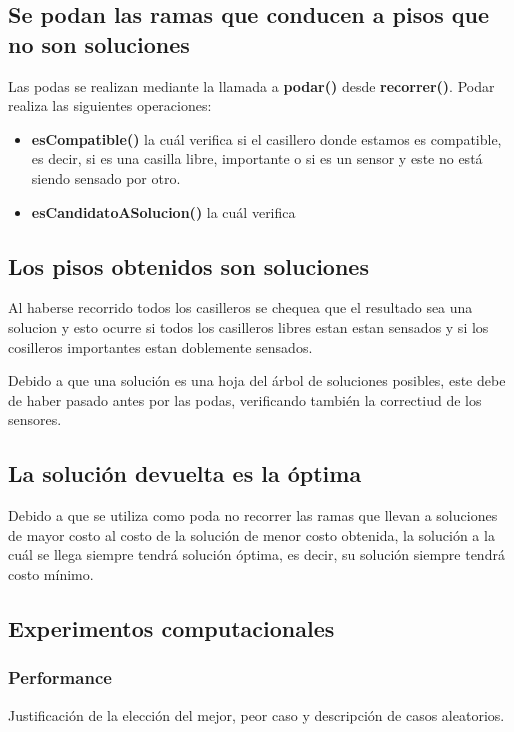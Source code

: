 \documentclass[a4paper, 10pt, twoside]{article}
\begin{document}
\subsection{Se podan las ramas que conducen a pisos que no son soluciones}

Las podas se realizan mediante la llamada a \textbf{podar()} desde \textbf{recorrer()}. Podar realiza las siguientes operaciones:

\begin{itemize}
  \item \textbf{esCompatible()} la cuál verifica si el casillero donde estamos es compatible, es decir, si es una casilla libre, importante o si es un sensor y este no está siendo sensado por otro.
    \item \textbf{esCandidatoASolucion()} la cuál verifica 
\end{itemize}


\subsection{Los pisos obtenidos son soluciones}
Al haberse recorrido todos los casilleros se chequea que el resultado sea una solucion y esto ocurre si todos los casilleros libres estan estan sensados y si los cosilleros importantes estan doblemente sensados.

Debido a que una solución es una hoja del árbol de soluciones posibles, este debe de haber pasado antes por las podas, verificando también la correctiud de los sensores.


\subsection{La solución devuelta es la óptima}
Debido a que se utiliza como poda no recorrer las ramas que llevan a soluciones de mayor costo al costo de la solución de menor costo obtenida, la solución a la cuál se llega siempre tendrá solución óptima, es decir, su solución siempre tendrá costo mínimo.


\subsection{Experimentos computacionales}

\subsubsection{Performance}
Justificación de la elección del mejor, peor caso y descripción de casos aleatorios.
\end{document}
